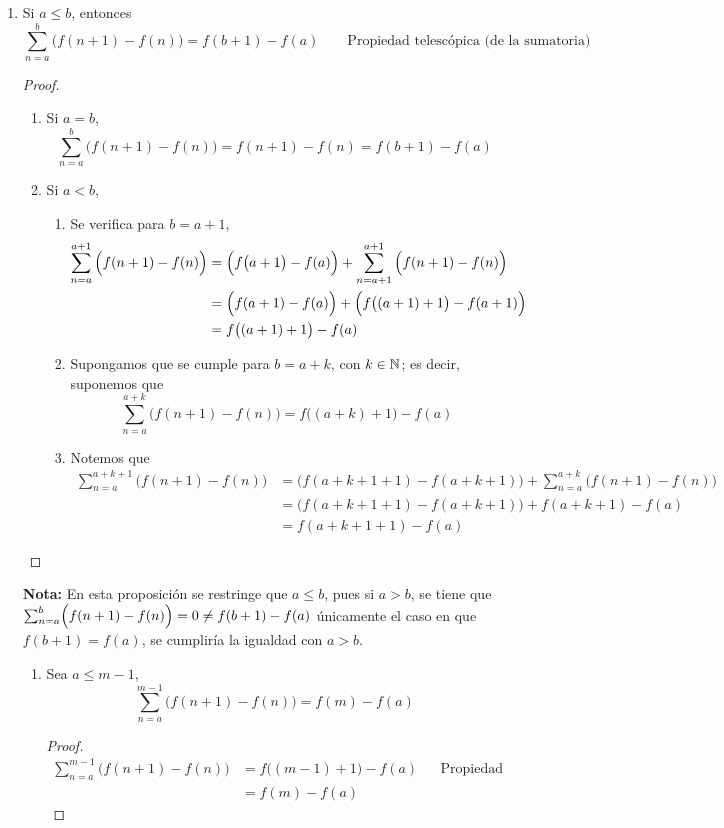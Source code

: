 \begin{enumerate}[label=\alph*)]
  \item Si $a\leq b$, entonces \[\sum_{n=a}^{b} \Big(f(n+1)-f(n)\Big) = f(b+1) - f(a) \qquad \text{Propiedad telescópica (de la sumatoria)}\]
  \begin{proof}\leavevmode
    \begin{enumerate}[label=\Roman*)]
      \item Si $a=b$, \[\sum_{n=a}^{b} \Big(f(n+1)-f(n)\Big) = f(n+1) - f(n) = f(b+1) - f(a)\]
      \item Si $a<b$,
      \begin{enumerate}[label=\roman*)]
        \item Se verifica para $b=a+1$,
        \begin{align*}
          \sum_{n=a}^{a+1} \Big(f(n+1)-f(n)\Big) &= \Bigl(f\big(a+1\big)-f(a)\Bigr) + \sum_{n=a+1}^{a+1} \Big(f(n+1)-f(n)\Big)\\
          &= \Bigl(f(a+1)-f(a)\Bigr) + \Bigl(f\big((a+1)+1\big)-f(a+1)\Bigr)\\
          &= f\bigl((a+1)+1\bigr) - f(a)
        \end{align*}
        \item Supongamos que se cumple para $b=a+k$, con $k\in \mathbb{N}$; es decir, suponemos que
        \[\sum_{n=a}^{a+k} \Big(f(n+1)-f(n)\Big) = f\bigl((a+k)+1\bigr) - f(a)\]
        \item Notemos que
        \begin{align*}
          \sum_{n=a}^{a+k+1} \Big(f(n+1)-f(n)\Big) &= \Big(f(a+k+1+1)-f(a+k+1)\Big) + \sum_{n=a}^{a+k} \Big(f(n+1)-f(n)\Big)\\
          &= \Big(f(a+k+1+1)-f(a+k+1)\Big) + f(a+k+1) - f(a)\\
          &= f(a+k+1+1) - f(a)
        \end{align*}
      \end{enumerate}
    \end{enumerate}
  \end{proof}
  
  \textbf{Nota:} En esta proposición se restringe que $a\leq b$, pues si $a>b$, se tiene que $\sum_{n=a}^{b} \Bigl(f(n+1)-f(n)\Bigr) = 0 \neq f(b+1) - f(a)$ únicamente el caso en que $f(b+1)=f(a)$, se cumpliría la igualdad con $a>b$.
  
  \begin{enumerate}[label=\roman*)]
  \item Sea $a\leq m -1$, \[\sum_{n=a}^{m-1} \Big(f(n+1) - f(n)\Big) = f(m)-f(a)\]
  \begin{proof}\leavevmode
    \begin{align*}
      \sum_{n=a}^{m-1} \Big(f(n+1) - f(n)\Big) &= f\big((m-1)+1\big) - f(a) && \text{Propiedad telescópica}\\
      &= f(m)-f(a)
    \end{align*}
  \end{proof}
  

\end{enumerate}
\end{enumerate}
